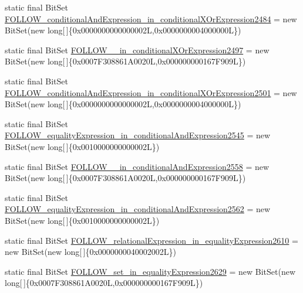 \begin{DoxyCompactItemize}
\item 
static final Bit\-Set \hyperlink{classorg_1_1tzi_1_1use_1_1parser_1_1soil_1_1_soil_parser_a6e11ec122b00ad544feb907c8252bde1}{F\-O\-L\-L\-O\-W\-\_\-conditional\-And\-Expression\-\_\-in\-\_\-conditional\-X\-Or\-Expression2484} = new Bit\-Set(new long\mbox{[}$\,$\mbox{]}\{0x0000000000000002\-L,0x0000000004000000\-L\})
\item 
static final Bit\-Set \hyperlink{classorg_1_1tzi_1_1use_1_1parser_1_1soil_1_1_soil_parser_aed1098f82c79e9454ea4707eef4d06fd}{F\-O\-L\-L\-O\-W\-\_\-\_\-in\-\_\-conditional\-X\-Or\-Expression2497} = new Bit\-Set(new long\mbox{[}$\,$\mbox{]}\{0x0007\-F308861\-A0020\-L,0x000000000167\-F909\-L\})
\item 
static final Bit\-Set \hyperlink{classorg_1_1tzi_1_1use_1_1parser_1_1soil_1_1_soil_parser_a36b63a7677ef4d36d2d40179282733a0}{F\-O\-L\-L\-O\-W\-\_\-conditional\-And\-Expression\-\_\-in\-\_\-conditional\-X\-Or\-Expression2501} = new Bit\-Set(new long\mbox{[}$\,$\mbox{]}\{0x0000000000000002\-L,0x0000000004000000\-L\})
\item 
static final Bit\-Set \hyperlink{classorg_1_1tzi_1_1use_1_1parser_1_1soil_1_1_soil_parser_a3d48fcab4ee62d1c942ec1d5796d7405}{F\-O\-L\-L\-O\-W\-\_\-equality\-Expression\-\_\-in\-\_\-conditional\-And\-Expression2545} = new Bit\-Set(new long\mbox{[}$\,$\mbox{]}\{0x0010000000000002\-L\})
\item 
static final Bit\-Set \hyperlink{classorg_1_1tzi_1_1use_1_1parser_1_1soil_1_1_soil_parser_a7520baffb78180037b12bab6ca7eab84}{F\-O\-L\-L\-O\-W\-\_\-\_\-in\-\_\-conditional\-And\-Expression2558} = new Bit\-Set(new long\mbox{[}$\,$\mbox{]}\{0x0007\-F308861\-A0020\-L,0x000000000167\-F909\-L\})
\item 
static final Bit\-Set \hyperlink{classorg_1_1tzi_1_1use_1_1parser_1_1soil_1_1_soil_parser_a9330042b4fb9dc73a4d719814fdc9271}{F\-O\-L\-L\-O\-W\-\_\-equality\-Expression\-\_\-in\-\_\-conditional\-And\-Expression2562} = new Bit\-Set(new long\mbox{[}$\,$\mbox{]}\{0x0010000000000002\-L\})
\item 
static final Bit\-Set \hyperlink{classorg_1_1tzi_1_1use_1_1parser_1_1soil_1_1_soil_parser_aad7a1fa8aa867ac310b1c5bf9c2ef634}{F\-O\-L\-L\-O\-W\-\_\-relational\-Expression\-\_\-in\-\_\-equality\-Expression2610} = new Bit\-Set(new long\mbox{[}$\,$\mbox{]}\{0x0000000040002002\-L\})
\item 
static final Bit\-Set \hyperlink{classorg_1_1tzi_1_1use_1_1parser_1_1soil_1_1_soil_parser_a61c617647c24ec3c3231482497c952ef}{F\-O\-L\-L\-O\-W\-\_\-set\-\_\-in\-\_\-equality\-Expression2629} = new Bit\-Set(new long\mbox{[}$\,$\mbox{]}\{0x0007\-F308861\-A0020\-L,0x000000000167\-F909\-L\})

\end{DoxyCompactItemize}
